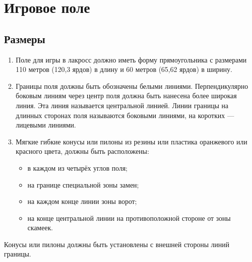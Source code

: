 \documentclass[../main.tex]{subfiles}
\begin{document}
\section{Игровое поле}
\subsection{Размеры}
\begin{enumerate}
\item Поле для игры в лакросс должно иметь форму прямоугольника с размерами 110 метров (120,3 ярдов) в длину и 60 метров (65,62 ярдов) в ширину.

\item Границы поля должны быть обозначены белыми линиями.\newline
Перпендикулярно боковым линиям через центр поля должна быть нанесена более широкая линия. Эта линия называется центральной линией.\newline
Линии границы на длинных сторонах поля называются боковыми линиями, на коротких --- лицевыми линиями. 

\item Мягкие гибкие конусы или пилоны из резины или пластика оранжевого или красного цвета, должны быть расположены: 
\begin{itemize}
  \item в каждом из четырёх углов поля; 
  \item на границе специальной зоны замен; 
  \item на каждом конце линии зоны ворот; 
  \item на конце центральной линии на противоположной стороне от зоны скамеек. 
\end{itemize}
\end{enumerate}
\noindent Конусы или пилоны должны быть установлены с внешней стороны линий границы.
\end{document}
